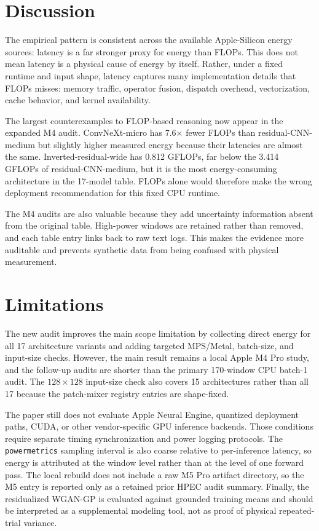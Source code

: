 \documentclass[conference]{IEEEtran}
\begin{document}
\section{Discussion}

The empirical pattern is consistent across the available Apple-Silicon energy
sources: latency is a far stronger proxy for energy than FLOPs. This
does not mean latency is a physical cause of energy by itself. Rather, under a
fixed runtime and input shape, latency captures many implementation details
that FLOPs misses: memory traffic, operator fusion, dispatch overhead,
vectorization, cache behavior, and kernel availability.

The largest counterexamples to FLOP-based reasoning now appear in the expanded
M4 audit. ConvNeXt-micro has 7.6$\times$ fewer FLOPs than residual-CNN-medium
but slightly higher measured energy because their latencies are almost the
same. Inverted-residual-wide has 0.812 GFLOPs, far below the 3.414 GFLOPs of
residual-CNN-medium, but it is the most energy-consuming architecture in the
17-model table. FLOPs alone would therefore make the wrong deployment
recommendation for this fixed CPU runtime.

The M4 audits are also valuable because they add uncertainty information absent
from the original table. High-power windows are retained rather than removed,
and each table entry links back to raw text logs. This makes the evidence more
auditable and prevents synthetic data from being confused with physical
measurement.

\section{Limitations}

The new audit improves the main scope limitation by collecting direct energy
for all 17 architecture variants and adding targeted MPS/Metal, batch-size,
and input-size checks. However, the main result remains a local Apple M4 Pro
study, and the follow-up audits are shorter than the primary 170-window CPU
batch-1 audit. The $128\times128$ input-size check also covers 15
architectures rather than all 17 because the patch-mixer registry entries are
shape-fixed.

The paper still does not evaluate Apple Neural Engine, quantized deployment
paths, CUDA, or other vendor-specific GPU inference backends. Those conditions
require separate timing synchronization and power logging protocols. The
\texttt{powermetrics} sampling interval is also coarse relative to
per-inference latency, so energy is attributed at the window level rather than
at the level of one forward pass. The local rebuild does not include a raw M5
Pro artifact directory, so the M5 entry is reported only as a retained prior
HPEC audit summary. Finally, the residualized WGAN-GP is evaluated against
grounded training
means and should be interpreted as a supplemental modeling tool, not as proof
of physical repeated-trial variance.
\end{document}
